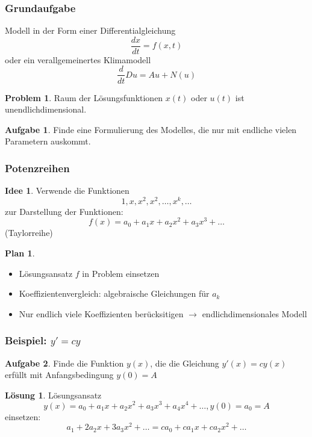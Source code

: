 %
%
%
\theoremstyle{definition}
\newtheorem{prob}{Problem}
\newtheorem{aufgabe}{Aufgabe}
\newtheorem{loesung}{Lösung}
\newtheorem{idee}{Idee}
\newtheorem{plan}{Plan}
\newtheorem{anomalie}{Übergang zur Anomalie}
\newtheorem{koeffizientenvergleich}{Koeffizientenvergleich}



\begin{frame}
\frametitle{Grundaufgabe}
Modell in der Form einer Differentialgleichung
\[
\frac{dx}{dt} = f(x,t)
\]
oder ein verallgemeinertes Klimamodell
\[
\frac{d}{dt} Du = Au + N(u)
\]
\begin{prob}
Raum der Lösungsfunktionen $x(t)$ oder $u(t)$ ist unendlichdimensional.
\end{prob}
\begin{aufgabe}
Finde eine Formulierung des Modelles, die nur mit endliche vielen
Parametern auskommt.
\end{aufgabe}
\end{frame}

\begin{frame}
\frametitle{Potenzreihen}
\begin{idee}
Verwende die Funktionen
\[
1, x, x^2, x^2, \dots, x^k,\dots
\]
zur Darstellung der Funktionen:
\[
f(x) = a_0 + a_1 x + a_2 x^2 + a_3 x^3 +\dots
\]
(Taylorreihe)
\end{idee}
\begin{plan}
\begin{itemize}
\item Lösungsansatz $f$ in Problem einsetzen
\item Koeffizientenvergleich: {\color{red}algebraische} Gleichungen für $a_k$
\item Nur endlich viele Koeffizienten berücksitigen $\rightarrow$
endlichdimensionales Modell
\end{itemize}
\end{plan}
\end{frame}

\begin{frame}
\frametitle{Beispiel: $y'=cy$}
\begin{aufgabe}
Finde die Funktion $y(x)$, die die Gleichung
$y'(x) = cy(x)$ erfüllt mit Anfangsbedingung $y(0) = A$
\end{aufgabe}
\begin{loesung}
Lösungsansatz
\[
y(x) = a_0 + a_1x + a_2x^2 + a_3x^3 +a_4x^4+\dots, y(0)=a_0=A
\]
einsetzen:
\[
a_1 + 2a_2x + 3a_3x^2 + \dots = ca_0 + ca_1x + ca_2x^2 + \dots
\]
\end{loesung}
\end{frame}


